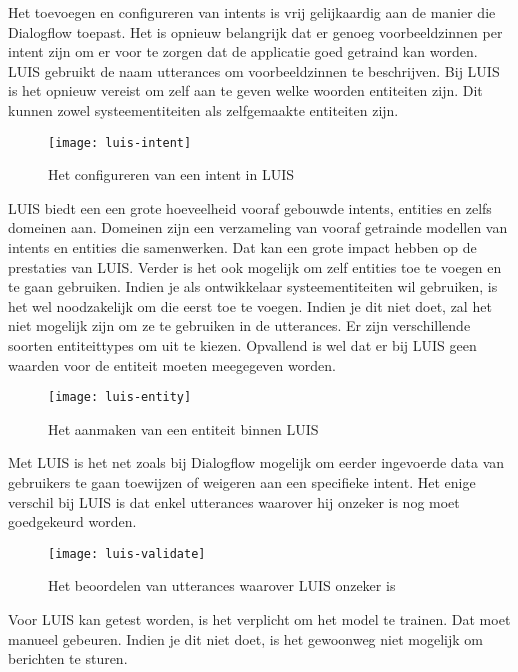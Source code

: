 Het toevoegen en configureren van intents is vrij gelijkaardig aan de manier die Dialogflow toepast. Het is opnieuw belangrijk dat er genoeg voorbeeldzinnen per intent zijn om er voor te zorgen dat de applicatie goed getraind kan worden. LUIS gebruikt de naam utterances om voorbeeldzinnen te beschrijven. Bij LUIS is het opnieuw vereist om zelf aan te geven welke woorden entiteiten zijn. Dit kunnen zowel systeementiteiten als zelfgemaakte entiteiten zijn.

\begin{figure}[H]
    \label{fig:luis-intent}
    \centering
    \texttt{[image: luis-intent]}
    \caption{Het configureren van een intent in LUIS}
\end{figure}

LUIS biedt een een grote hoeveelheid vooraf gebouwde intents, entities en zelfs domeinen aan. Domeinen zijn een verzameling van vooraf getrainde modellen van intents en entities die samenwerken. Dat kan een grote impact hebben op de prestaties van LUIS. Verder is het ook mogelijk om zelf entities toe te voegen en te gaan gebruiken. Indien je als ontwikkelaar systeementiteiten wil gebruiken, is het wel noodzakelijk om die eerst toe te voegen. Indien je dit niet doet, zal het niet mogelijk zijn om ze te gebruiken in de utterances. Er zijn verschillende soorten entiteittypes om uit te kiezen. Opvallend is wel dat er bij LUIS geen waarden voor de entiteit moeten meegegeven worden.

\begin{figure}[H]
    \label{fig:luis-entity}
    \centering
    \texttt{[image: luis-entity]}
    \caption{Het aanmaken van een entiteit binnen LUIS}
\end{figure}

Met LUIS is het net zoals bij Dialogflow mogelijk om eerder ingevoerde data van gebruikers te gaan toewijzen of weigeren aan een specifieke intent. Het enige verschil bij LUIS is dat enkel utterances waarover hij onzeker is nog moet goedgekeurd worden.

\begin{figure}[H]
    \label{fig:luis-validate}
    \centering
    \texttt{[image: luis-validate]}
    \caption{Het beoordelen van utterances waarover LUIS onzeker is}
\end{figure}

Voor LUIS kan getest worden, is het verplicht om het model te trainen. Dat moet manueel gebeuren. Indien je dit niet doet, is het gewoonweg niet mogelijk om berichten te sturen.

